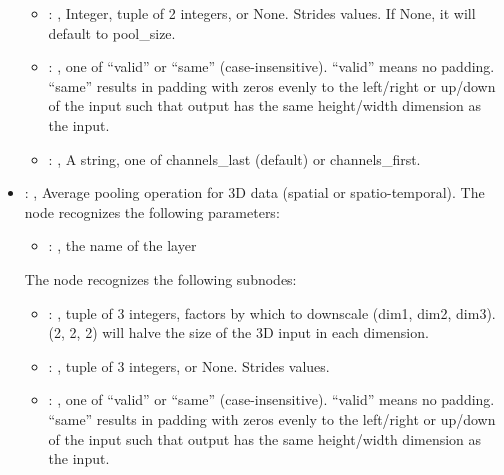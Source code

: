\begin{itemize}
\begin{itemize}
        \item {}: , 
          Integer, tuple of 2 integers, or None. Strides values. If None, it will default to
          pool\_size.

        \item {}: , 
          one of ``valid'' or ``same'' (case-insensitive). ``valid'' means no padding. ``same''
          results in padding         with zeros evenly to the left/right or up/down of the input
          such that output has the same height/width         dimension as the input.

        \item {}: , 
          A string, one of channels\_last (default) or channels\_first.
      \end{itemize}

    \item {}: , 
      Average pooling operation for 3D data (spatial or spatio-temporal).
      The  node recognizes the following parameters:
        \begin{itemize}
          \item {}: , 
            the name of the layer
      \end{itemize}

      The  node recognizes the following subnodes:
      \begin{itemize}
        \item {}: , 
          tuple of 3 integers, factors by which to downscale (dim1, dim2, dim3). (2, 2, 2) will
          halve the size         of the 3D input in each dimension.

        \item {}: , 
          tuple of 3 integers, or None. Strides values.

        \item {}: , 
          one of ``valid'' or ``same'' (case-insensitive). ``valid'' means no padding. ``same''
          results in padding         with zeros evenly to the left/right or up/down of the input
          such that output has the same height/width         dimension as the input.


\end{itemize}
\end{itemize}

